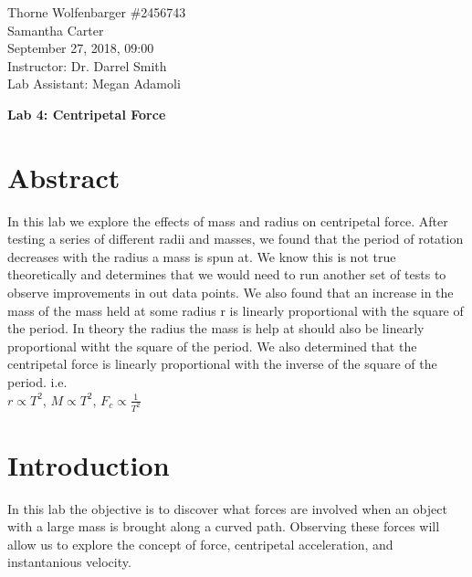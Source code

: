 \documentclass[12pt]{report}
\begin{document}

\newpage
\begin{flushleft}
\begin{flushright}
\begin{scriptsize}
  Thorne Wolfenbarger \#2456743\\
  Samantha Carter\\
  September 27, 2018, 09:00\\
  Instructor: Dr. Darrel Smith\\
  Lab Assistant: Megan Adamoli\\
\end{scriptsize}
\end{flushright}
\begin{center}
\Large \textbf{Lab 4: Centripetal Force}
\end{center}

\begin{multicols}{2}
\section{Abstract}
In this lab we explore the effects of mass and radius on centripetal force.
After testing a series of different radii and masses, we found that the period
of rotation decreases with the radius a mass is spun at. We know this is not true theoretically and determines that we would need to run another set of tests to observe improvements in out data points. We also found that an increase in the mass of the mass held at some radius r is linearly proportional with the square of the period. In theory the radius the mass is help at should also be linearly proportional witht the square of the period. We also determined that the centripetal force is linearly proportional with the inverse of the square of the period. i.e.\\
$r\propto T^2$,
$M\propto T^2$,
$F_c\propto \frac{1}{T^2}$
\section{Introduction}
In this lab the objective is to discover what forces are involved when an
object with a large mass is brought along a curved path. Observing these forces
will allow us to explore the concept of force, centripetal acceleration, and
instantanious velocity.

\end{multicols}
\end{flushleft}
\end{document}
